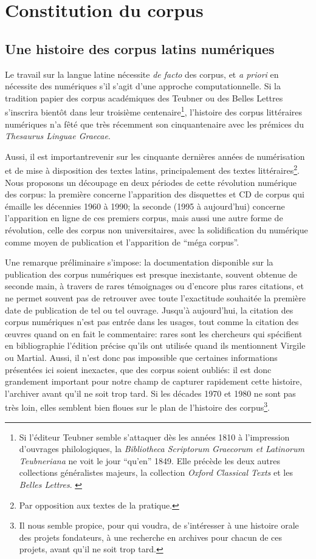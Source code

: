 \chapter{Constitution du corpus}

\section{Une histoire des corpus latins numériques}

Le travail sur la langue latine nécessite \textit{de facto} des corpus, et \textit{a priori} en nécessite des numériques s'il s'agit d'une approche computationnelle. Si la tradition papier des corpus académiques des Teubner ou des Belles Lettres s'inscrira bientôt dans leur troisième centenaire\footnote{Si l'éditeur Teubner semble s'attaquer dès les années 1810 à l'impression d'ouvrages philologiques, la \textit{Bibliotheca Scriptorum Graecorum et Latinorum Teubneriana} ne voit le jour \enquote{qu'en} 1849. Elle précède les deux autres collections généralistes majeurs, la collection \textit{Oxford Classical Texts} et les \textit{Belles Lettres}. \cite{andre_cent-cinquante_1974}}, l'histoire des corpus littéraires numériques n'a fêté que très récemment son cinquantenaire avec les prémices du \textit{Thesaurus Linguae Graecae}.

Aussi, il est importantrevenir sur les cinquante dernières années de numérisation et de mise à disposition des textes latins, principalement des textes littéraires\footnote{Par opposition aux textes de la pratique.}. Nous proposons un découpage en deux périodes de cette révolution numérique des corpus: la première concerne l'apparition des disquettes et CD de corpus qui émaille les décennies 1960 à 1990; la seconde (1995 à aujourd'hui) concerne l'apparition en ligne de ces premiers corpus, mais aussi une autre forme de révolution, celle des corpus non universitaires, avec la solidification du numérique comme moyen de publication et l'apparition de \enquote{méga corpus}.

Une remarque préliminaire s'impose: la documentation disponible sur la publication des corpus numériques est presque inexistante, souvent obtenue de seconde main, à travers de rares témoignages ou d'encore plus rares citations, et ne permet souvent pas de retrouver avec toute l'exactitude souhaitée la première date de publication de tel ou tel ouvrage. Jusqu'à aujourd'hui, la citation des corpus numériques n'est pas entrée dans les usages, tout comme la citation des œuvres quand on en fait le commentaire: rares sont les chercheurs qui spécifient en bibliographie l'édition précise qu'ils ont utilisée quand ils mentionnent Virgile ou Martial. Aussi, il n'est donc pas impossible que certaines informations présentées ici soient inexactes, que des corpus soient oubliés: il est donc grandement important pour notre champ de capturer rapidement cette histoire, l'archiver avant qu'il ne soit trop tard. Si les décades 1970 et 1980 ne sont pas très loin, elles semblent bien floues sur le plan de l'histoire des corpus\footnote{Il nous semble propice, pour qui voudra, de s'intéresser à une histoire orale des projets fondateurs, à une recherche en archives pour chacun de ces projets, avant qu'il ne soit trop tard.}.

